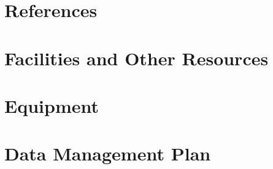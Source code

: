 \documentclass[11pt,article,crop=false]{standalone}
\begin{document}
\thispagestyle{empty}
\AddToShipoutPicture*{\BackgroundPic}



\clearpage
{}

\thispagestyle{fancy}
\setlength{\headheight}{19.7478pt}
\setlength{\headsep}{4pt}
\newlength{\nsfoffset}
\setlength{\nsfoffset}{\headheight}
\addtolength{\nsfoffset}{\baselineskip}



\clearpage

\appendix



\clearpage




\clearpage

%
\section{References}
\printbibliography[heading=bibempty]
\clearpage

\section{Facilities and Other Resources}\label{sec:facilities}


\section{Equipment}\label{sec:equipment}


\section{Data Management Plan}\label{sec:dataplan}

\end{document}
